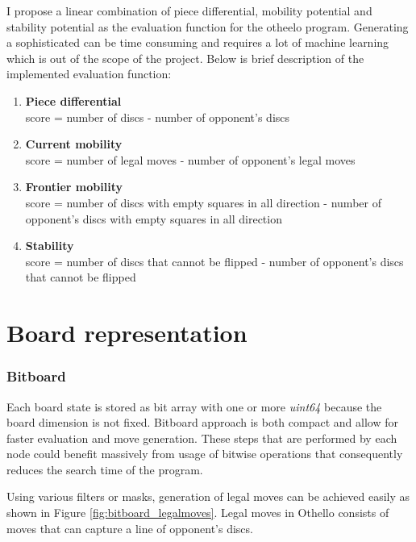 \documentclass[12pt]{article}
\begin{document}
I propose a linear combination of piece differential, mobility potential and
stability potential as the evaluation function for the otheelo program.
Generating a sophisticated can be time consuming and requires a lot of machine
learning which is out of the scope of the project. Below is brief description of
the implemented evaluation function:

\begin{enumerate}
  \item \textbf{Piece differential} \\
    score = number of discs - number of opponent's discs
  \item \textbf{Current mobility} \\
    score = number of legal moves - number of opponent's legal moves
  \item \textbf{Frontier mobility} \\
    score = number of discs with empty squares in all direction - number of
    opponent's discs with empty squares in all direction
  \item \textbf{Stability} \\
    score = number of discs that cannot be flipped - number of opponent's
    discs that cannot be flipped
\end{enumerate}


\section{Board representation}

\subsubsection{Bitboard}

Each board state is stored as bit array with one or more \textit{uint64}
because the board dimension is not fixed. Bitboard approach is both compact and
allow for faster evaluation and move generation. These steps that are performed
by each node could benefit massively from usage of bitwise operations that
consequently reduces the search time of the program.

Using various filters or masks, generation of legal moves can be achieved easily
as shown in Figure \ref{fig:bitboard_legalmoves}. Legal moves in Othello
consists of moves that can capture a line of opponent's discs.
\end{document}
